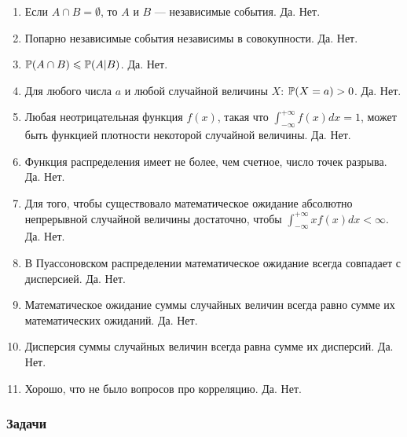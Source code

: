\documentclass[12pt, a4paper]{article}\usepackage[]{graphicx}\usepackage[]{color}
\begin{document}
\begin{enumerate}

\item Если $A \cap B = \emptyset$, то $A$ и $B$ — независимые события. Да. Нет.

\item Попарно независимые события независимы в совокупности. Да. Нет.

\item $\P(A \cap B) \le \P(A|B)$. Да. Нет.

\item Для любого числа $a$ и любой случайной величины $X$: $\P(X=a)>0$. Да. Нет.

\item Любая неотрицательная функция $f(x)$, такая что $\int_{-\infty}^{+\infty} f(x) dx = 1$, может быть функцией плотности некоторой случайной величины. Да. Нет.

\item Функция распределения имеет не более, чем счетное, число точек разрыва. Да. Нет.

\item Для того, чтобы существовало математическое ожидание абсолютно непрерывной случайной величины достаточно, чтобы $\int_{-\infty}^{+\infty} x f(x) dx < \infty$. Да. Нет.

\item В Пуассоновском распределении математическое ожидание всегда совпадает с дисперсией.	Да. Нет.

\item Математическое ожидание суммы случайных величин всегда равно сумме их математических ожиданий.	Да. Нет.

\item Дисперсия суммы случайных величин всегда равна сумме их дисперсий.	Да. Нет.

\item Хорошо, что не было вопросов про корреляцию.	Да. Нет.

\end{enumerate}

\subsubsection*{Задачи}
\end{document}
